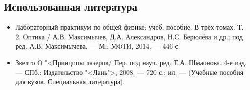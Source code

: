 \documentclass[12pt]{kiarticle}
\begin{document}
\subsection*{Использованная литература}

{\small 
\begin{itemize}
	
	\item Лабораторный практикум по общей физике: учеб. пособие. В трёх томах. Т. 2. Оптика / А.В. Максимычев, Д.А. Александров, Н.С. Берюлёва и др.; под ред. А.В. Максимычева. --- М.: МФТИ, 2014. --- 446 с.
	
	\item Звелто O "<Принципы лазеров/ Пер. под науч. ред. Т.А. Шмаонова. 4-е изд. --- СПб.: Издательство "<Лань">, 2008. --- 720 с.: ил. --- (Учебные пособия для вузов. Специальная литература).
	
\end{itemize}
}
\end{document}
